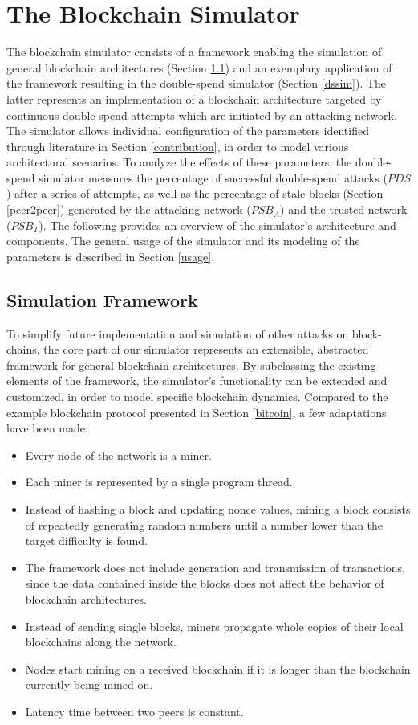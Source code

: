 \documentclass[a4paper,12pt,twoside]{report}
\begin{document}
\chapter{The Blockchain Simulator} \label{simulator}
The blockchain simulator consists of a framework enabling the simulation of general blockchain architectures (Section \ref{simframework}) and an exemplary application of the framework resulting in the double-spend simulator (Section \ref{dssim}). The latter represents an implementation of a blockchain architecture targeted by continuous double-spend attempts which are initiated by an attacking network. The simulator allows individual configuration of the parameters identified through literature in Section \ref{contribution}, in order to model various architectural scenarios. To analyze the effects of these parameters, the double-spend simulator measures the percentage of successful double-spend attacks ($PDS$) after a series of attempts, as well as the percentage of stale blocks (Section \ref{peer2peer}) generated by the attacking network ($PSB_A$) and the trusted network ($PSB_T$). The following provides an overview of the simulator's architecture and components. The general usage of the simulator and its modeling of the parameters is described in Section \ref{usage}.
\section{Simulation Framework} \label{simframework}
To simplify future implementation and simulation of other attacks on block-chains, the core part of our simulator represents an extensible, abstracted framework for general blockchain architectures. By subclassing the existing elements of the framework, the simulator's functionality can be extended and customized, in order to model specific blockchain dynamics. Compared to the example blockchain protocol presented in Section \ref{bitcoin}, a few adaptations have been made:
\begin{itemize}
\item Every node of the network is a miner.
\item Each miner is represented by a single program thread.
\item Instead of hashing a block and updating nonce values, mining a block consists of repeatedly generating random numbers until a number lower than the target difficulty is found.
\item The framework does not include generation and transmission of transactions, since the data contained inside the blocks does not affect the behavior of blockchain architectures.
\item Instead of sending single blocks, miners propagate whole copies of their local blockchains along the network.
\item Nodes start mining on a received blockchain if it is longer than the blockchain currently being mined on.
\item Latency time between two peers is constant.
\end{itemize}
\end{document}
